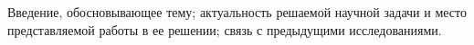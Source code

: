 \intro \label{ch:intro}

Введение, обосновывающее тему; актуальность решаемой научной задачи и место
представляемой работы в ее решении; связь с предыдущими исследованиями.
